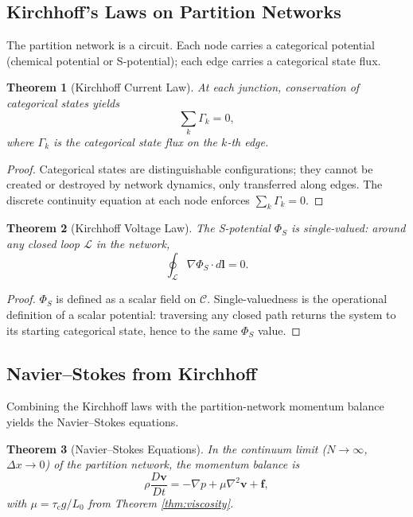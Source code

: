\documentclass[twocolumn,10pt,a4paper]{article}
\newtheorem{theorem}{Theorem}[section]
\theoremstyle{definition}
\theoremstyle{remark}
\newcommand{\tauC}{\tau_{\mathrm{c}}}
\newcommand{\Cspace}{\mathcal{C}}
\newcommand{\Spotential}{\Phi_S}
\begin{document}
\subsection{Kirchhoff's Laws on Partition Networks}

The partition network is a circuit. Each node carries a categorical potential (chemical potential or S-potential); each edge carries a categorical state flux.

\begin{theorem}[Kirchhoff Current Law]
\label{thm:kcl}
At each junction, conservation of categorical states yields
\begin{equation}
\sum_k \Gamma_k = 0,
\label{eq:kcl}
\end{equation}
where $\Gamma_k$ is the categorical state flux on the $k$-th edge.
\end{theorem}

\begin{proof}
Categorical states are distinguishable configurations; they cannot be created or destroyed by network dynamics, only transferred along edges. The discrete continuity equation at each node enforces $\sum_k \Gamma_k = 0$.
\end{proof}

\begin{theorem}[Kirchhoff Voltage Law]
\label{thm:kvl}
The S-potential $\Spotential$ is single-valued: around any closed loop $\mathcal{L}$ in the network,
\begin{equation}
\oint_{\mathcal{L}} \nabla\Spotential \cdot d\mathbf{l} = 0.
\label{eq:kvl}
\end{equation}
\end{theorem}

\begin{proof}
$\Spotential$ is defined as a scalar field on $\Cspace$. Single-valuedness is the operational definition of a scalar potential: traversing any closed path returns the system to its starting categorical state, hence to the same $\Spotential$ value.
\end{proof}

\subsection{Navier--Stokes from Kirchhoff}

Combining the Kirchhoff laws with the partition-network momentum balance yields the Navier--Stokes equations.

\begin{theorem}[Navier--Stokes Equations]
\label{thm:navier_stokes}
In the continuum limit ($N \to \infty$, $\Delta x \to 0$) of the partition network, the momentum balance is
\begin{equation}
\rho \frac{D\mathbf{v}}{Dt} = -\nabla p + \mu \nabla^2 \mathbf{v} + \mathbf{f},
\label{eq:navier_stokes}
\end{equation}
with $\mu = \tauC g / L_0$ from Theorem \ref{thm:viscosity}.
\end{theorem}
\end{document}
